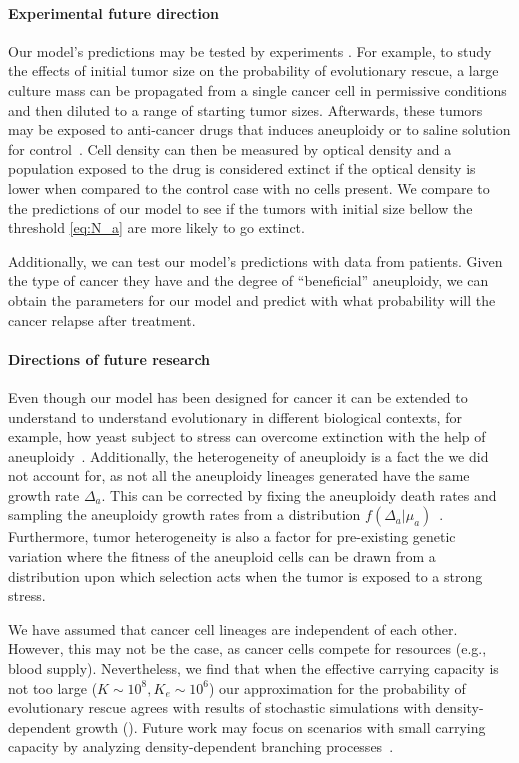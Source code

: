 \documentclass[12pt]{extarticle}
\begin{document}
\paragraph{Experimental future direction}
Our model's predictions may be tested by experiments \citep{martin2013probability}. For example, to study the effects of initial tumor size on the probability of evolutionary rescue, a large culture mass can be propagated from a single cancer cell in permissive conditions and then diluted to a  range of starting tumor sizes. Afterwards, these tumors may be exposed to anti-cancer drugs that induces aneuploidy or to saline solution for control~\citep{ippolito2021gene}. 
Cell density can then be measured by optical density and a population exposed to the drug is considered extinct if the optical density is lower when compared to the control case with no cells present. We compare to the predictions of our model to see if the tumors with initial size bellow the threshold \eqref{eq:N_a} are more likely to go extinct.   

Additionally, we can test our model's predictions with data from patients. Given the type of cancer they have and the degree of ``beneficial'' aneuploidy,  we can obtain the parameters for our model and predict with what probability will the cancer relapse after treatment.


\paragraph{Directions of future research}
Even though our model has been designed for cancer it can be extended to understand to understand evolutionary in different biological contexts, for example, how yeast subject to stress can overcome extinction with the help of aneuploidy~\citep{pompei2023fitness}. Additionally, the heterogeneity of aneuploidy is a fact the we did not account for, as not all the aneuploidy lineages generated have the same growth rate $\Delta_a$. This can be corrected by  fixing the aneuploidy death rates and sampling the aneuploidy growth rates from a distribution $f\left(\Delta_a|\mu_a\right)$~\citet{martin2013probability}. Furthermore, tumor heterogeneity is also a factor for pre-existing genetic variation where the fitness of the aneuploid cells can be drawn from a distribution upon which selection acts when the tumor is exposed to a strong stress.

We have assumed that cancer cell lineages are independent of each other. However, this may not be the case, as cancer cells compete for resources (e.g., blood supply). Nevertheless, we find that when the effective carrying capacity is not too large ($K\sim10^8, K_e\sim10^6$) 
our approximation for the probability of evolutionary rescue agrees with results of stochastic simulations with density-dependent growth  ().
Future work may focus on scenarios with small carrying capacity by analyzing density-dependent branching processes~\citep{klebaner1997population,harris1963theory}. 
\end{document}
